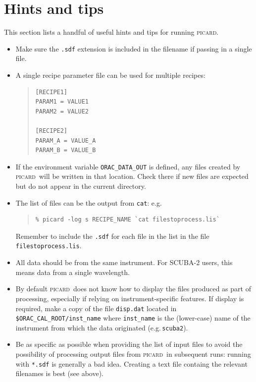 \documentclass[twoside,11pt]{article}
\renewcommand{\_}{\texttt{\symbol{95}}}
\newenvironment{myquote}{\begin{quote}\begin{small}}{\end{small}\end{quote}}
\newcommand{\picard}{\textsc{picard}}
\begin{document}
\section{Hints and tips\label{se:hints}}

This section lists a handful of useful hints and tips for running
\picard.

\begin{itemize}

\item
Make sure the \verb+.sdf+ extension is included in the filename if
passing in a single file.

\item A single recipe parameter file can be used for multiple recipes:
\begin{myquote}
\begin{verbatim}
[RECIPE1]
PARAM1 = VALUE1
PARAM2 = VALUE2

[RECIPE2]
PARAM_A = VALUE_A
PARAM_B = VALUE_B
\end{verbatim}
\end{myquote}

\item If the environment variable \verb+ORAC_DATA_OUT+ is defined, any
  files created by \picard\ will be written in that location. Check
  there if new files are expected but do not appear in the current
  directory.

\item The list of files can be the output from \texttt{cat}: e.g.\
\begin{myquote}
\begin{verbatim}
% picard -log s RECIPE_NAME `cat filestoprocess.lis`
\end{verbatim}
\end{myquote}
Remember to include the \verb+.sdf+ for each file in the list in the
file \verb+filestoprocess.lis+.

\item All data should be from the same instrument. For SCUBA-2 users,
  this means data from a single wavelength.

\item By default \picard\ does not know how to display the files
  produced as part of processing, especially if relying on
  instrument-specific features. If display is required, make a copy of
  the file \texttt{disp.dat} located in
  \verb+$ORAC_CAL_ROOT/inst_name+ where \verb+inst_name+ is the
  (lower-case) name of the instrument from which the data originated
  (e.g.\,\verb+scuba2+).

\item Be as specific as possible when providing the list of input
  files to avoid the possibility of processing output files from
  \picard\ in subsequent runs: running with \verb+*.sdf+ is generally
  a bad idea. Creating a text file containg the relevant filenames is
  best (see above).

\end{itemize}
\end{document}
